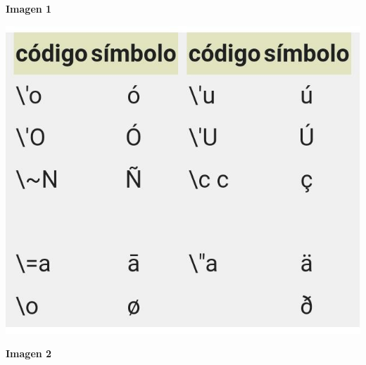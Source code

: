 \documentclass{article}
\begin{document}
\Large \textbf{Imagen 1}

\includegraphics[scale = 0.5]{codigodos.jpg.jpeg}

\Large \textbf{Imagen 2}
\end{document}
